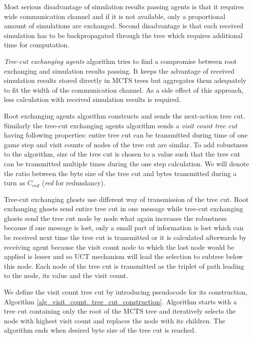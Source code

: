 Most serious disadvantage of simulation results passing agents is that it requires wide
communication channel and if it is not available, only a proportional amount of simulations are
exchanged. Second disadvantage is that each received simulation has to be backpropagated
through the tree which requires additional time for computation.

\emph{Tree-cut exchanging agents} algorithm tries to find a compromise between root exchanging 
and simulation results passing. It keeps the advantage of received simulation results stored
directly in MCTS trees but aggregates them adequately to fit the width of the communication
channel. As a side effect of this approach, less calculation with received simulation results
is required.


Root exchanging agents algorithm constructs and sends the next-action tree cut. Similarly the
tree-cut exchanging agents algorithm sends a \emph{visit count tree cut} having following
properties: entire tree cut can be transmitted during time of one game step and visit counts of
nodes of the tree cut are similar. To add robustness to the algorithm, size of the tree cut is
chosen to a value such that the tree cut can be transmitted multiple times during the
one step calculation. We will denote the ratio between the byte size of the tree cut and bytes
transmitted during a turn as $C_{red}$ (\emph{red} for redundancy).

Tree-cut exchanging ghosts use different way of transmission of the tree cut. Root exchanging
ghosts send entire tree cut in one message while tree-cut exchanging ghosts send the tree cut
node by node what again increases the robustness because if one message is lost, only a small
part of information is lost which can be received next time the tree cut is transmitted or it
is calculated afterwards by receiving agent because the visit count node to which the lost node 
would be
applied is lesser and so UCT mechanism will lead the selection to subtree below this node. Each
node of the tree cut is transmitted as the triplet of path leading to the node, its value and
the visit count.

We define the visit count tree cut by introducing pseudocode for its construction, Algorithm
\ref{alg_visit_count_tree_cut_construction}. Algorithm starts with a tree cut containing only
the root of the MCTS tree and iteratively selects the node with highest visit count and
replaces the node with its children. The algorithm ends when desired byte size of the tree cut
is reached.

